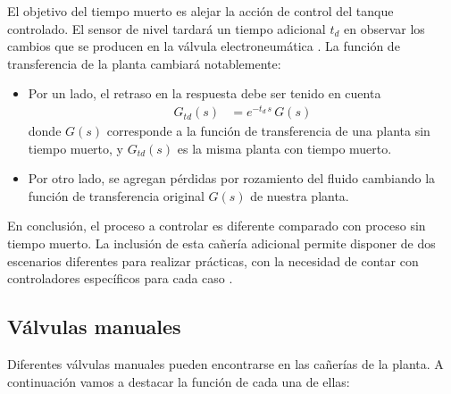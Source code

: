 El objetivo del tiempo muerto es alejar la acción de control del tanque
controlado.
El sensor de nivel tardará un tiempo adicional $t_d$ en observar los cambios
que se producen en la válvula electroneumática \cite{bib:ApuntesPuglesiTema2}.
La función de transferencia de la planta cambiará notablemente:
\begin{itemize}
 \item Por un lado, el retraso en la respuesta debe ser tenido en cuenta
 \begin{align}
  G_{td}(s) &= e^{-t_d\,s}\,G(s)
 \end{align}
 donde $G(s)$ corresponde a la función de transferencia de una planta sin
 tiempo muerto, y $G_{td}(s)$ es la misma planta con tiempo muerto.
  \item Por otro lado, se agregan pérdidas por rozamiento del
  fluido cambiando la función de transferencia original $G(s)$ de nuestra
  planta.
\end{itemize}
En conclusión, el proceso a controlar es diferente comparado con proceso sin
tiempo muerto.
La inclusión de esta cañería adicional permite disponer de dos escenarios
diferentes para realizar prácticas, con la necesidad de contar con
controladores específicos para cada caso \cite{bib:ApuntesPuglesiTema2}.

\subsection{Válvulas manuales}

Diferentes válvulas manuales pueden encontrarse en las cañerías de la planta.
A continuación vamos a destacar la función de cada una de ellas:

